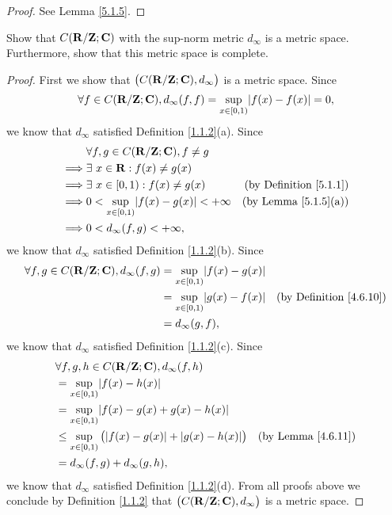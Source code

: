 \begin{proof}
    See Lemma \ref{5.1.5}.
\end{proof}

\begin{exercise}\label{ex 5.1.3}
    Show that \(C(\mathbf{R} / \mathbf{Z} ; \mathbf{C})\) with the sup-norm metric \(d_\infty\) is a metric space.
    Furthermore, show that this metric space is complete.
\end{exercise}

\begin{proof}
    First we show that \(\big(C(\mathbf{R} / \mathbf{Z} ; \mathbf{C}), d_\infty\big)\) is a metric space.
    Since
    \[
        \forall f \in C(\R / \Z ; \C), d_\infty(f, f) = \sup_{x \in [0, 1)} \abs{f(x) - f(x)} = 0,
    \]
    we know that \(d_\infty\) satisfied Definition \ref{1.1.2}(a).
    Since
    \begin{align*}
                 & \forall f, g \in C(\R / \Z ; \C), f \neq g                                               \\
        \implies & \exists\ x \in \R : f(x) \neq g(x)                                                       \\
        \implies & \exists\ x \in [0, 1) : f(x) \neq g(x)              & \text{(by Definition \ref{5.1.1})} \\
        \implies & 0 < \sup_{x \in [0, 1)} \abs{f(x) - g(x)} < +\infty & \text{(by Lemma \ref{5.1.5}(a))}   \\
        \implies & 0 < d_\infty(f, g) < +\infty,
    \end{align*}
    we know that \(d_\infty\) satisfied Definition \ref{1.1.2}(b).
    Since
    \begin{align*}
        \forall f, g \in C(\R / \Z ; \C), d_\infty(f, g) & = \sup_{x \in [0, 1)} \abs{f(x) - g(x)}                                       \\
                                                         & = \sup_{x \in [0, 1)} \abs{g(x) - f(x)} & \text{(by Definition \ref{4.6.10})} \\
                                                         & = d_\infty(g, f),
    \end{align*}
    we know that \(d_\infty\) satisfied Definition \ref{1.1.2}(c).
    Since
    \begin{align*}
         & \forall f, g, h \in C(\R / \Z ; \C), d_\infty(f, h)                                                       \\
         & = \sup_{x \in [0, 1)} \abs{f(x) - h(x)}                                                                   \\
         & = \sup_{x \in [0, 1)} \abs{f(x) - g(x) + g(x) - h(x)}                                                     \\
         & \leq \sup_{x \in [0, 1)} \big(\abs{f(x) - g(x)} + \abs{g(x) - h(x)}\big) & \text{(by Lemma \ref{4.6.11})} \\
         & = d_\infty(f, g) + d_\infty(g, h),
    \end{align*}
    we know that \(d_\infty\) satisfied Definition \ref{1.1.2}(d).
    From all proofs above we conclude by Definition \ref{1.1.2} that \(\big(C(\mathbf{R} / \mathbf{Z} ; \mathbf{C}), d_\infty\big)\) is a metric space.


\end{proof}
